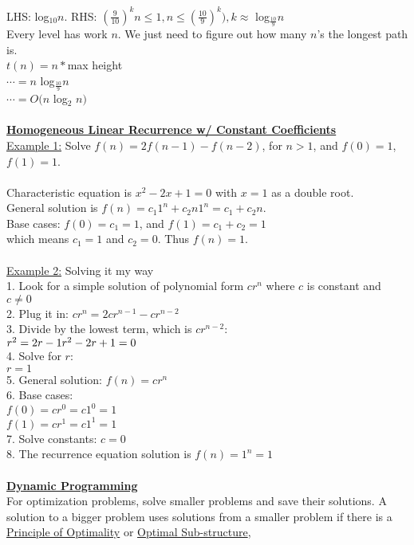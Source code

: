 \documentclass[8pt,letterpaper,twocolumn]{article}
\begin{document}
LHS: log$_{10}n$. RHS: $(\frac{9}{10})^kn \leq 1, n \leq (\frac{10}{9})^k), k \approx$ log$_{\frac{10}{9}}n$\\
Every level has work $n$. We just need to figure out how many $n$'s the longest path is.\\
$t(n)=n*$max height\\
$\cdots=n$ log$_{\frac{10}{9}}n$\\
$\cdots=O(n$ log$_2$ $n)$\\
\\
\underline{\textbf{Homogeneous Linear Recurrence w/ Constant Coefficients}}\\
\underline{Example 1:} Solve $f(n) = 2 f (n-1) - f (n-2)$, for $n > 1$, and $f(0) = 1$, $f (1) = 1$.\\ \\
Characteristic equation is $x^2 - 2x + 1 = 0$ with $x = 1$ as a double root.\\
General solution is $f(n) = c_1 1^n + c_2 n1^n = c_1 + c_2 n$.\\
Base cases: $f(0) = c_1 = 1$, and $f (1) = c_1 + c_2 = 1$ \\
which means $c_1 = 1$ and $c_2 = 0$. Thus $f(n) = 1$. \\
\\
\underline{Example 2:} Solving it my way\\
1. Look for a simple solution of polynomial form $cr^n$ where $c$ is constant and $c\neq0$ \\
2. Plug it in: $cr^n=2cr^{n-1}-cr^{n-2}$ \\
3. Divide by the lowest term, which is $cr^{n-2}$: \\ $r^2=2r-1 \\ r^2-2r+1=0$ \\
4. Solve for $r$: \\ $r=1$ \\
5. General solution: $f(n)=cr^n$ \\
6. Base cases: \\ $f(0)=cr^0=c1^0=1$ \\ $f(1)=cr^1=c1^1=1$ \\
7. Solve constants: $c=0$ \\
8. The recurrence equation solution is $f(n)=1^n=1$ \\
\\
\underline{\textbf{Dynamic Programming}}\\
For optimization problems, solve smaller problems and save their solutions. A solution to a bigger problem uses solutions
from a smaller problem if there is a \underline{Principle of Optimality} or \underline{Optimal Sub-structure},
\end{document}
